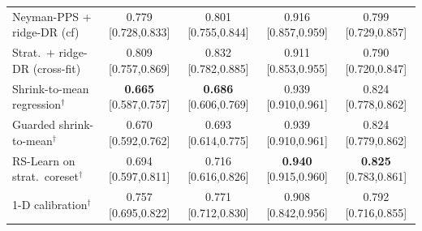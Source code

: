 \begin{tabular}{l cccc}
Neyman-PPS + ridge-DR (cf) & 0.779 {\scriptsize[0.728,0.833]} & 0.801 {\scriptsize[0.755,0.844]} & 0.916 {\scriptsize[0.857,0.959]} & 0.799 {\scriptsize[0.729,0.857]} \\
Strat.\ + ridge-DR (cross-fit) & 0.809 {\scriptsize[0.757,0.869]} & 0.832 {\scriptsize[0.782,0.885]} & 0.911 {\scriptsize[0.853,0.955]} & 0.790 {\scriptsize[0.720,0.847]} \\
Shrink-to-mean regression$^\dagger$ & \textbf{0.665} {\scriptsize[0.587,0.757]} & \textbf{0.686} {\scriptsize[0.606,0.769]} & 0.939 {\scriptsize[0.910,0.961]} & 0.824 {\scriptsize[0.778,0.862]} \\
Guarded shrink-to-mean$^\dagger$ & 0.670 {\scriptsize[0.592,0.762]} & 0.693 {\scriptsize[0.614,0.775]} & 0.939 {\scriptsize[0.910,0.961]} & 0.824 {\scriptsize[0.779,0.862]} \\
RS-Learn on strat.\ coreset$^\dagger$ & 0.694 {\scriptsize[0.597,0.811]} & 0.716 {\scriptsize[0.616,0.826]} & \textbf{0.940} {\scriptsize[0.915,0.960]} & \textbf{0.825} {\scriptsize[0.783,0.861]} \\
1-D calibration$^\dagger$ & 0.757 {\scriptsize[0.695,0.822]} & 0.771 {\scriptsize[0.712,0.830]} & 0.908 {\scriptsize[0.842,0.956]} & 0.792 {\scriptsize[0.716,0.855]} \\
\bottomrule
\end{tabular}
